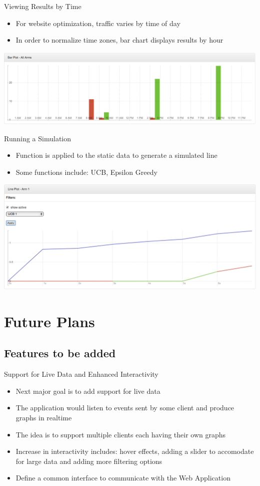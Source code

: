 \documentclass{beamer}
\begin{document}
\begin{frame}{Viewing Results by Time}
\begin{itemize}
\item For website optimization, traffic varies by time of day
\item In order to normalize time zones, bar chart displays results by hour
\end{itemize}
\includegraphics[scale=0.25]{barcharttime.png}
\end{frame}

\begin{frame}{Running a Simulation}
\begin{itemize}
\item Function is applied to the static data to generate a simulated line
\item Some functions include: UCB, Epsilon Greedy
\end{itemize}
\includegraphics[scale=0.25]{linechartfunction.png}
\end{frame}

\section{Future Plans}

\subsection{Features to be added}
\begin{frame}{Support for Live Data and Enhanced Interactivity}
\begin{itemize}
\item Next major goal is to add support for live data
\item The application would listen to events sent by some client and produce graphs in realtime
\item The idea is to support multiple clients each having their own graphs
\item Increase in interactivity includes: hover effects, adding a slider to accomodate for large data and adding more filtering options
\item Define a common interface to communicate with the Web Application
\end{itemize}
\end{frame}
\end{document}
